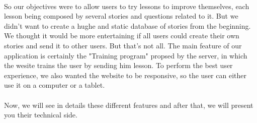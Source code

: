 \paragraph{}
So our objectives were to allow users to try lessons to improve themselves, each lesson being composed by several stories and questions related to it. But we didn't want to create a hughe and static database of stories from the beginning. We thought it would be more entertaining if all users could create their own stories and send it to other users. But that's not all. The main feature of our application is certainly the "Training program" propsed by the server, in which the wesite trains the user by sending him lesson.
To perform the best user experience, we also wanted the website to be responsive, so the user can either use it on a computer or a tablet. 


\paragraph{}
Now, we will see in details these different features and after that, we will present you their technical side.
